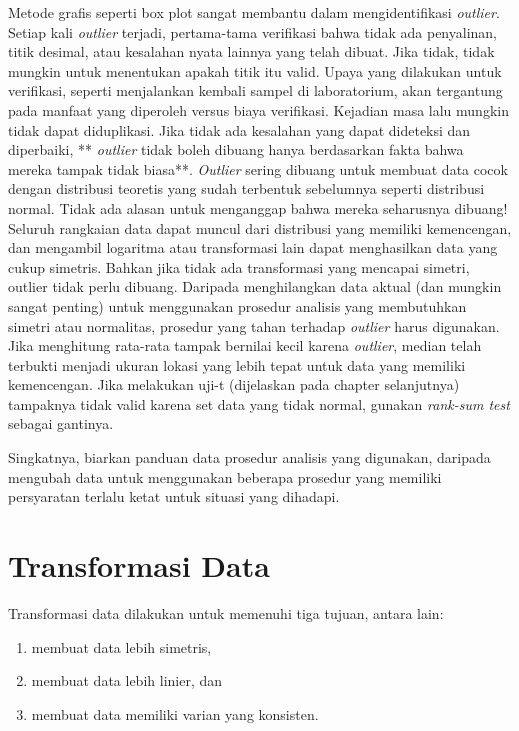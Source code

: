 \documentclass[]{book}
\providecommand{\tightlist}{%
  \setlength{\itemsep}{0pt}\setlength{\parskip}{0pt}}
\begin{document}
Metode grafis seperti box plot sangat membantu dalam mengidentifikasi
\emph{outlier}. Setiap kali \emph{outlier} terjadi, pertama-tama
verifikasi bahwa tidak ada penyalinan, titik desimal, atau kesalahan
nyata lainnya yang telah dibuat. Jika tidak, tidak mungkin untuk
menentukan apakah titik itu valid. Upaya yang dilakukan untuk
verifikasi, seperti menjalankan kembali sampel di laboratorium, akan
tergantung pada manfaat yang diperoleh versus biaya verifikasi. Kejadian
masa lalu mungkin tidak dapat diduplikasi. Jika tidak ada kesalahan yang
dapat dideteksi dan diperbaiki, ** \emph{outlier} tidak boleh dibuang
hanya berdasarkan fakta bahwa mereka tampak tidak biasa**.
\emph{Outlier} sering dibuang untuk membuat data cocok dengan distribusi
teoretis yang sudah terbentuk sebelumnya seperti distribusi normal.
Tidak ada alasan untuk menganggap bahwa mereka seharusnya dibuang!
Seluruh rangkaian data dapat muncul dari distribusi yang memiliki
kemencengan, dan mengambil logaritma atau transformasi lain dapat
menghasilkan data yang cukup simetris. Bahkan jika tidak ada
transformasi yang mencapai simetri, outlier tidak perlu dibuang.
Daripada menghilangkan data aktual (dan mungkin sangat penting) untuk
menggunakan prosedur analisis yang membutuhkan simetri atau normalitas,
prosedur yang tahan terhadap \emph{outlier} harus digunakan. Jika
menghitung rata-rata tampak bernilai kecil karena \emph{outlier}, median
telah terbukti menjadi ukuran lokasi yang lebih tepat untuk data yang
memiliki kemencengan. Jika melakukan uji-t (dijelaskan pada chapter
selanjutnya) tampaknya tidak valid karena set data yang tidak normal,
gunakan \emph{rank-sum test} sebagai gantinya.

Singkatnya, biarkan panduan data prosedur analisis yang digunakan,
daripada mengubah data untuk menggunakan beberapa prosedur yang memiliki
persyaratan terlalu ketat untuk situasi yang dihadapi.

\section{Transformasi Data}\label{transformasi-data-1}

Transformasi data dilakukan untuk memenuhi tiga tujuan, antara lain:

\begin{enumerate}
\def\labelenumi{\arabic{enumi}.}
\tightlist
\item
  membuat data lebih simetris,
\item
  membuat data lebih linier, dan
\item
  membuat data memiliki varian yang konsisten.
\end{enumerate}
\end{document}
